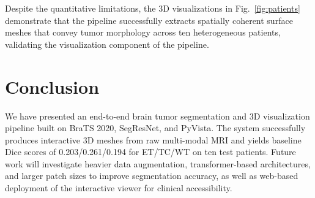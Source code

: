 \documentclass[conference]{IEEEtran}
\begin{document}
Despite the quantitative limitations, the 3D visualizations in
Fig.~\ref{fig:patients} demonstrate that the pipeline successfully extracts
spatially coherent surface meshes that convey tumor morphology across ten
heterogeneous patients, validating the visualization component of the
pipeline.

\section{Conclusion}

We have presented an end-to-end brain tumor segmentation and 3D
visualization pipeline built on BraTS 2020, SegResNet, and PyVista. The
system successfully produces interactive 3D meshes from raw multi-modal
MRI and yields baseline Dice scores of 0.203/0.261/0.194 for ET/TC/WT on
ten test patients. Future work will investigate heavier data augmentation,
transformer-based architectures, and larger patch sizes to improve
segmentation accuracy, as well as web-based deployment of the interactive
viewer for clinical accessibility.
\end{document}
